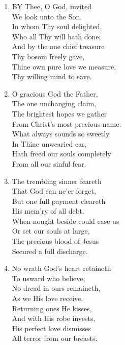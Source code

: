 \documentclass[11pt,a4paper]{article}
\begin{document}
\begin{enumerate}
    \item BY Thee, O God, invited \\
        We look unto the Son, \\
        In whom Thy soul delighted, \\
        Who all Thy will hath done; \\
        And by the one chief treasure \\
        Thy bosom freely gave, \\
        Thine own pure love we measure, \\
        Thy willing mind to save.

    \item O gracious God the Father, \\
        The one unchanging claim, \\
        The brightest hopes we gather \\
        From Christ's most precious name. \\
        What always sounds so sweetly \\
        In Thine unwearied ear, \\
        Hath freed our souls completely \\
        From all our sinful fear.

    \item The trembling sinner feareth \\
        That God can ne'er forget, \\
        But one full payment cleareth \\
        His mem'ry of all debt. \\
        When nought beside could ease us \\
        Or set our souls at large, \\
        The precious blood of Jesus \\
        Secured a full discharge.

    \item No wrath God's heart retaineth \\
        To usward who believe; \\
        No dread in ours remaineth, \\
        As we His love receive. \\
        Returning ones He kisses, \\
        And with His robe invests, \\
        His perfect love dismisses \\
        All terror from our breasts.

\end{enumerate}
\end{document}

